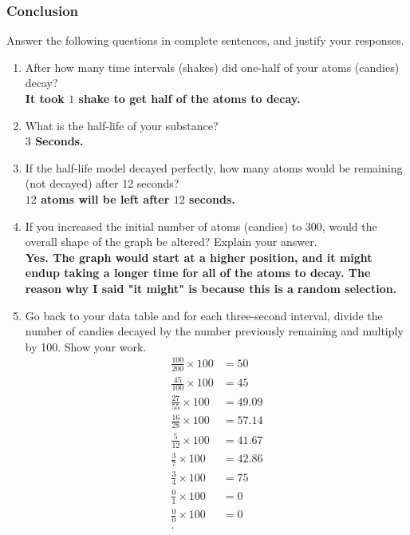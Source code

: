 \newpage

\subsubsection{Conclusion}

Answer the following questions in complete sentences, and justify your responses.

\begin{enumerate}
  \item After how many time intervals (shakes) did one-half of your atoms
    (candies) decay? \\
    \bf{It took $1$ shake to get half of the atoms to decay.}

  \item What is the half-life of your substance? \\
    \bf{$3$ Seconds.}

  \item If the half-life model decayed perfectly, how many atoms would be
    remaining (not decayed) after 12 seconds? \\
    \bf{$12$ atoms will be left after $12$ seconds.}

  \item If you increased the initial number of atoms (candies) to 300, would the
    overall shape of the graph be altered? Explain your answer. \\
    \bf{Yes. The graph would start at a higher position, and it might endup
    taking a longer time for all of the atoms to decay. The reason why I said
    "it might" is because this is a random selection.}

  \item Go back to your data table and for each three-second interval, divide
    the number of candies decayed by the number previously remaining and
    multiply by 100. Show your work. \\
    \begin{align}
      \frac{100}{200} \times  100  &= 50         \\
      \frac{45}{100}  \times  100  &= 45         \\
      \frac{27}{55}   \times  100  &= 49.09      \\
      \frac{16}{28}   \times  100  &= 57.14      \\
      \frac{5}{12}    \times  100  &= 41.67      \\
      \frac{3}{7}     \times  100  &= 42.86      \\
      \frac{3}{4}     \times  100  &= 75         \\
      \frac{0}{1}     \times  100  &= 0          \\
      \frac{0}{0}     \times  100  &= 0          \\
    .\end{align}


\end{enumerate}
